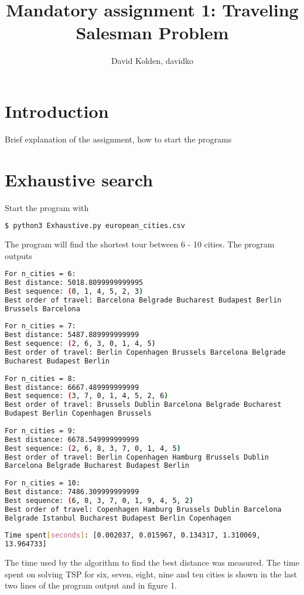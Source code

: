 \documentclass{article}
\author{David Kolden, davidko}
\title{Mandatory assignment 1: Traveling Salesman Problem}
\begin{document}
\maketitle
\tableofcontents

\section{Introduction}
Brief explanation of the assignment, how to start the programs
\section{Exhaustive search}

Start the program with
\begin{lstlisting}[language=bash]
	$ python3 Exhaustive.py european_cities.csv 
\end{lstlisting}
The program will find the shortest tour between 6 - 10 cities. The program outputs

\begin{lstlisting}[language=bash]
For n_cities = 6:
Best distance: 5018.8099999999995
Best sequence: (0, 1, 4, 5, 2, 3)
Best order of travel: Barcelona Belgrade Bucharest Budapest Berlin 
Brussels Barcelona
 
For n_cities = 7:
Best distance: 5487.889999999999
Best sequence: (2, 6, 3, 0, 1, 4, 5)
Best order of travel: Berlin Copenhagen Brussels Barcelona Belgrade 
Bucharest Budapest Berlin
 
For n_cities = 8:
Best distance: 6667.489999999999
Best sequence: (3, 7, 0, 1, 4, 5, 2, 6)
Best order of travel: Brussels Dublin Barcelona Belgrade Bucharest 
Budapest Berlin Copenhagen Brussels
 
For n_cities = 9:
Best distance: 6678.549999999999
Best sequence: (2, 6, 8, 3, 7, 0, 1, 4, 5)
Best order of travel: Berlin Copenhagen Hamburg Brussels Dublin 
Barcelona Belgrade Bucharest Budapest Berlin
 
For n_cities = 10:
Best distance: 7486.309999999999
Best sequence: (6, 8, 3, 7, 0, 1, 9, 4, 5, 2)
Best order of travel: Copenhagen Hamburg Brussels Dublin Barcelona 
Belgrade Istanbul Bucharest Budapest Berlin Copenhagen
	 
Time spent[seconds]: [0.002037, 0.015967, 0.134317, 1.310069, 
13.964733]
\end{lstlisting}

The time used by the algorithm to find the best distance was measured. The time spent on solving TSP for six, seven, eight, nine and ten cities is shown in the last two lines of the program output and in figure 1.
\end{document}
